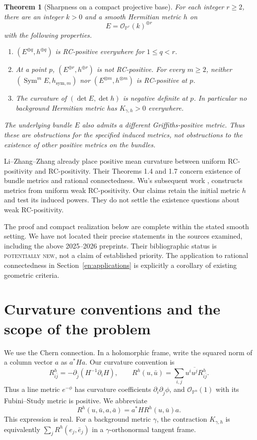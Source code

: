 \documentclass[12pt]{amsart}
\newtheorem{thm}{Theorem}[section]
\theoremstyle{definition}
\theoremstyle{remark}
\numberwithin{equation}{section}
\DeclareMathOperator{\Sym}{Sym}
\theoremstyle{definition}
\begin{document}
\begin{thm}[Sharpness on a compact projective base]\label{en:sharp}
For each integer $r\geq2$, there are an integer $k>0$ and a smooth
Hermitian metric $h$ on
\[
 E=\mathcal O_{\mathbb P^r}(k)^{\oplus r}
\]
with the following properties.
\begin{enumerate}
\item $(E^{\oplus q},h^{\oplus q})$ is RC-positive everywhere for
$1\leq q<r$.
\item At a point $p$, $(E^{\oplus r},h^{\oplus r})$ is not RC-positive.
For every $m\geq2$, neither $(\Sym^m E,h_{\mathrm{sym},m})$ nor
$(E^{\otimes m},h^{\otimes m})$ is RC-positive at $p$.
\item The curvature of $(\det E,\det h)$ is negative definite at $p$.
In particular no background Hermitian metric has $K_{\gamma,h}>0$
everywhere.
\end{enumerate}
The underlying bundle $E$ also admits a different Griffiths-positive metric.
Thus these are obstructions for the specified induced metrics, not
obstructions to the existence of other positive metrics on the bundles.
\end{thm}

Li--Zhang--Zhang \cite[Proposition 3.6]{en:LZZ} already place positive mean
curvature between uniform RC-positivity and RC-positivity. Their
Theorems 1.4 and 1.7 concern existence of bundle metrics and rational
connectedness. Wu's subsequent work \cite[Theorem 3]{en:Wu25},
\cite[Theorem 7]{en:Wu26} constructs metrics from uniform weak
RC-positivity. Our claims retain the initial metric $h$ and test its
induced powers. They do not settle the existence questions about weak
RC-positivity.

The proof and compact realization below are complete within the stated
smooth setting. We have not located their precise statements in the
sources examined, including the above 2025--2026 preprints. Their
bibliographic status is \textsc{potentially new}, not a claim of established
priority. The application to rational connectedness in
Section~\ref{en:applications} is explicitly a corollary of existing
geometric criteria.

\section{Curvature conventions and the scope of the problem}
\label{en:conventions}

We use the Chern connection. In a holomorphic frame, write the squared
norm of a column vector $a$ as $a^*Ha$. Our curvature convention is
\begin{equation}\label{en:chern}
 R^h_{i\bar j}=-\partial_{\bar j}(H^{-1}\partial_iH),\qquad
 R^h(u,\bar u)=\sum_{i,j}u^i\overline{u^j}R^h_{i\bar j}.
\end{equation}
Thus a line metric $e^{-\phi}$ has curvature coefficients
$\partial_i\partial_{\bar j}\phi$, and $\mathcal O_{\mathbb P^n}(1)$
with its Fubini--Study metric is positive. We abbreviate
\[
 R^h(u,\bar u,a,\bar a)=a^*H R^h(u,\bar u)a.
\]
This expression is real. For a background metric $\gamma$, the contraction
$K_{\gamma,h}$ is equivalently $\sum_jR^h(e_j,\bar e_j)$ in a
$\gamma$-orthonormal tangent frame.
\end{document}
